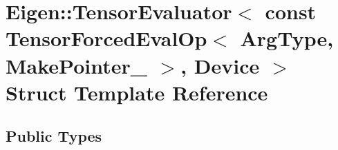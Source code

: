 \hypertarget{struct_eigen_1_1_tensor_evaluator_3_01const_01_tensor_forced_eval_op_3_01_arg_type_00_01_make_pointer___01_4_00_01_device_01_4}{}\section{Eigen\+:\+:Tensor\+Evaluator$<$ const Tensor\+Forced\+Eval\+Op$<$ Arg\+Type, Make\+Pointer\+\_\+ $>$, Device $>$ Struct Template Reference}
\label{struct_eigen_1_1_tensor_evaluator_3_01const_01_tensor_forced_eval_op_3_01_arg_type_00_01_make_pointer___01_4_00_01_device_01_4}
\subsection*{Public Types}
